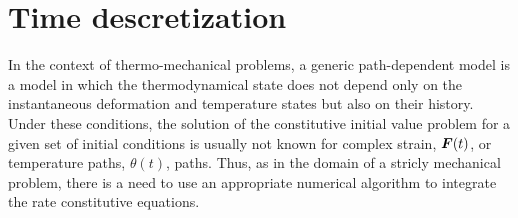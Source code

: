 \section{Time descretization} \label{sec:time_discretization}

In the context of thermo-mechanical problems, a generic path-dependent model is a model in which the thermodynamical state does not depend only on the instantaneous deformation and temperature states but also on their history.
Under these conditions, the solution of the constitutive initial value problem for a given set of initial conditions is usually not known for complex strain, $\bm{F}(t)$, or temperature paths, \(\theta(t)\), paths.
Thus, as in the domain of a stricly mechanical problem, there is a need to use an appropriate numerical algorithm to integrate the rate constitutive equations.

